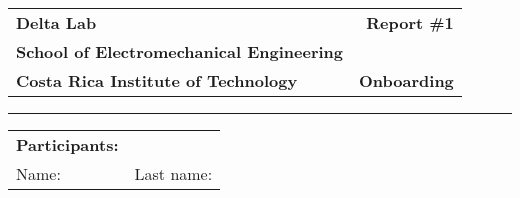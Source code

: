\documentclass[12pt]{article}
\begin{document}
\noindent
\begin{tabularx}{\linewidth}{Xr}
\textbf{Delta Lab} & \textbf{Report \#1} \\
\textbf{School of Electromechanical Engineering} & ~ \\
\textbf{Costa Rica Institute of Technology} & \textbf{Onboarding} \\
\end{tabularx}

\noindent\rule[2ex]{\textwidth}{2pt}
\begin{tabularx}{\linewidth}{Xr}
\textbf{Participants:} & \\
Name: & Last name: 
\end{tabularx}
\end{document}
